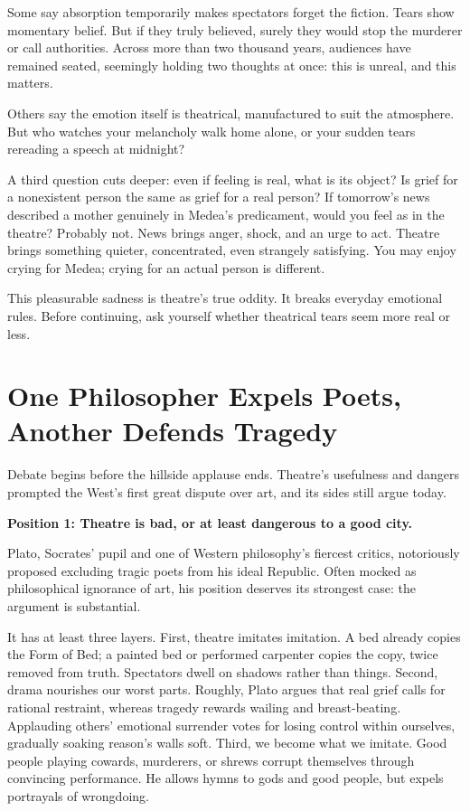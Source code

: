 Some say absorption temporarily makes spectators forget the fiction. Tears show momentary belief. But if they truly believed, surely they would stop the murderer or call authorities. Across more than two thousand years, audiences have remained seated, seemingly holding two thoughts at once: this is unreal, and this matters.

Others say the emotion itself is theatrical, manufactured to suit the atmosphere. But who watches your melancholy walk home alone, or your sudden tears rereading a speech at midnight?

A third question cuts deeper: even if feeling is real, what is its object? Is grief for a nonexistent person the same as grief for a real person? If tomorrow's news described a mother genuinely in Medea's predicament, would you feel as in the theatre? Probably not. News brings anger, shock, and an urge to act. Theatre brings something quieter, concentrated, even strangely satisfying. You may enjoy crying for Medea; crying for an actual person is different.

This pleasurable sadness is theatre's true oddity. It breaks everyday emotional rules. Before continuing, ask yourself whether theatrical tears seem more real or less.

\section[Expelling Poets, Defending Tragedy]{One Philosopher Expels Poets, Another Defends Tragedy}
Debate begins before the hillside applause ends. Theatre's usefulness and dangers prompted the West's first great dispute over art, and its sides still argue today.

\textbf{Position 1: Theatre is bad, or at least dangerous to a good city.}

Plato, Socrates' pupil and one of Western philosophy's fiercest critics, notoriously proposed excluding tragic poets from his ideal Republic. Often mocked as philosophical ignorance of art, his position deserves its strongest case: the argument is substantial.

It has at least three layers. First, theatre imitates imitation. A bed already copies the Form of Bed; a painted bed or performed carpenter copies the copy, twice removed from truth. Spectators dwell on shadows rather than things. Second, drama nourishes our worst parts. Roughly, Plato argues that real grief calls for rational restraint, whereas tragedy rewards wailing and breast-beating. Applauding others' emotional surrender votes for losing control within ourselves, gradually soaking reason's walls soft. Third, we become what we imitate. Good people playing cowards, murderers, or shrews corrupt themselves through convincing performance. He allows hymns to gods and good people, but expels portrayals of wrongdoing.

